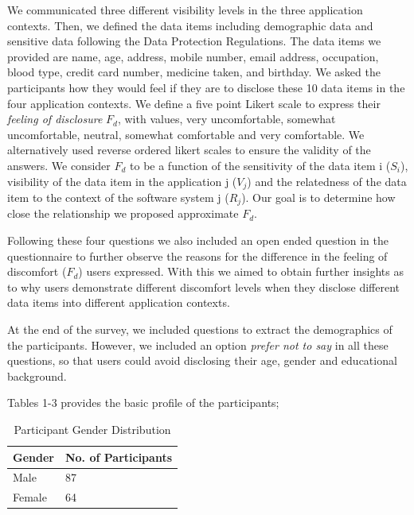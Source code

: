 \documentclass[conference]{IEEEtran}
\begin{document}
We communicated three different visibility levels in the three application contexts. Then, we defined the data items including demographic data and sensitive data following the Data Protection Regulations. The data items we provided are name, age, address, mobile number, email address, occupation, blood type, credit card number, medicine taken, and birthday. We asked the participants how they would feel if they are to disclose these 10 data items in the four application contexts. We define a five point Likert scale to express their \textit{feeling of disclosure} $F_d$, with values, very uncomfortable, somewhat uncomfortable, neutral, somewhat comfortable and very comfortable. We alternatively used reverse ordered likert scales to ensure the validity of the answers. We consider $F_d$ to be a function of the sensitivity of the data item i ($S_i$), visibility of the data item in the application j ($V_j$) and the relatedness of the data item to the context of the software system j ($R_j$). Our goal is to determine how close the relationship we proposed approximate $F_d$.

Following these four questions we also included an open ended question in the questionnaire to further observe the reasons for the difference in the feeling of discomfort ($F_d$) users expressed. With this we aimed to obtain further insights as to why users demonstrate different discomfort levels when they disclose different data items into different application contexts. 

At the end of the survey, we included questions to extract the demographics of the participants. However, we included an option \textit{prefer not to say} in all these questions, so that users could avoid disclosing their age, gender and educational background.

Tables 1-3 provides the basic profile of the participants;

\begin{center}
\begin{table}[htbp]
\caption{Participant Gender Distribution}
\begin{center}
\begin{tabular}{|l|l|} 
\hline
Gender & No. of Participants \\
\hline
Male & 87 \\
\hline
Female & 64 \\
\hline
\end{tabular}
\end{center}
\end{table}
\end{center} 
\end{document}
